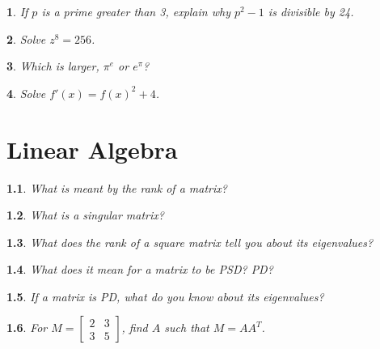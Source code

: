 \documentclass{report}
\newtheorem{problem}{}
\numberwithin{problem}{chapter} %
\begin{document}
\begin{problem}
\cite{CRACK}
If $p$ is a prime greater than 3, explain why $p^2-1$ is divisible by 24. 
\end{problem}

\begin{problem}
Solve $z^8=256$.
\end{problem}

\begin{problem}
\cite{STRAWA}
Which is larger, $\pi^e$ or $e^\pi$?
\end{problem}

\begin{problem}
Solve $f'(x)=f(x)^2+4$.
\end{problem}
%

\chapter{Linear Algebra}

\begin{problem}
What is meant by the {\it rank} of a matrix? 
\end{problem}

\begin{problem}
What is a  {\it singular} matrix? 
\end{problem}

\begin{problem}
What does the rank of a square matrix tell you about its eigenvalues?
\end{problem}

\begin{problem}
What does it mean for a matrix to be PSD? PD?
\end{problem}

\begin{problem}
If a matrix is PD, what do you know about its eigenvalues?
\end{problem}

\begin{problem}
For $M =\begin{bmatrix}
    2  & 3 \\
    3  & 5
\end{bmatrix}$, find $A$ such that $M=AA^{T}$.
\end{problem}
\end{document}

